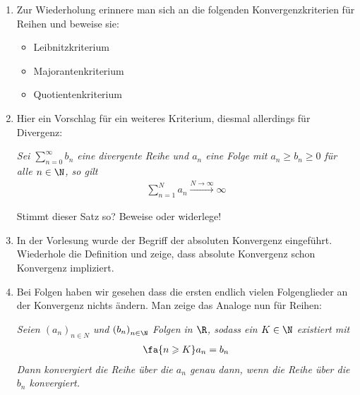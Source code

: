 \begin{exercise}
  \begin{enumerate}[label=(\alph*)]
  \item Zur Wiederholung erinnere man sich an die folgenden Konvergenzkriterien
    für Reihen und beweise sie:
    \begin{itemize}
    \item Leibnitzkriterium
    \item Majorantenkriterium
    \item Quotientenkriterium
    \end{itemize}

  \item Hier ein Vorschlag für ein weiteres Kriterium, diesmal allerdings für
    Divergenz:
    \begin{theorem}\normalfont\itshape
      Sei $\sum \limits_{ n=0 }^{ \infty } b_n $ eine divergente Reihe und $a_n$
      eine Folge mit $a_n \geqslant b_n \geqslant 0$ für alle $n\in \N$, so gilt
      \begin{equation*}
        \begin{split}
          \sum\limits_{ n=1 }^{ N }{ a_n } \overset{N \to \infty}{\longrightarrow} \infty
        \end{split}
      \end{equation*}
    \end{theorem}
    Stimmt dieser Satz so? Beweise oder widerlege!

  \item In der Vorlesung wurde der Begriff der absoluten Konvergenz eingeführt.
    Wiederhole die Definition und zeige, dass absolute Konvergenz schon
    Konvergenz impliziert.

  \item Bei Folgen haben wir gesehen dass die ersten endlich vielen
    Folgenglieder an der Konvergenz nichts ändern. Man zeige das Analoge nun für
    Reihen:
    \begin{theorem}
      \normalfont\itshape Seien $\left( a_n \right)_{n \in N}$ und
      $\left( b_n \right)_{n\in \N}$ Folgen in $\R$, sodass ein $K \in \N$
      existiert mit
      \begin{equation*}
        \begin{split}
          \fa{n \geqslant K} a_n = b_n
        \end{split}
      \end{equation*}
      Dann konvergiert die Reihe über die $a_n$ genau dann, wenn die Reihe über
      die $b_n$ konvergiert.
    \end{theorem}
  \end{enumerate}
\end{exercise}
